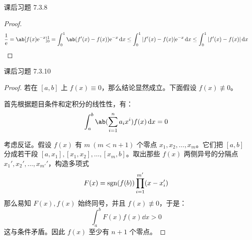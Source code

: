 \begin{problem}
	课后习题 7.3.8

	\begin{proof}
		$$
		\begin{aligned}
			\frac{1}{\E} = \ab[f(x) \E^{-x}]_0^1 = \int_0^1 \ab(f'(x) - f(x)) \E^{-x} \dd{x} \le \int_0^1 |f'(x) - f(x)| \E^{-x} \dd{x} \le \int_0^1 |f'(x) - f(x)| \dd{x}
		\end{aligned}
		$$
	\end{proof}
\end{problem}

\begin{problem}
	课后习题 7.3.10

	\begin{proof}
		若在 $[a, b]$ 上 $f(x) \equiv 0$，那么结论显然成立。下面假设 $f(x) \not\equiv 0$。

		首先根据题目条件和定积分的线性性，有：
		$$
		\int_a^b \ab(\sum_{i=1}^n a_i x^i) f(x) \dd{x} = 0
		$$

		考虑反证。假设 $f(x)$ 有 $m\ (m < n + 1)$ 个零点 $x_1, x_2, \dots, x_m$。它们把 $[a, b]$ 分成若干段 $[a, x_1], [x_1, x_2], \dots, [x_m, b]$。取出那些 $f(x)$ 两侧异号的分隔点 $x_1', x_2', \dots, x_{m'}'$，构造多项式
		$$
		F(x) = \operatorname{sgn}(f(b)) \prod_{i=1}^{m'} (x - x_i')
		$$
		那么易知 $F(x), f(x)$ 始终同号，并且 $f(x) \not\equiv 0$，于是：
		$$
		\int_a^b F(x) f(x) \dd{x} > 0
		$$
		这与条件矛盾。因此 $f(x)$ 至少有 $n + 1$ 个零点。
	\end{proof}
\end{problem}

